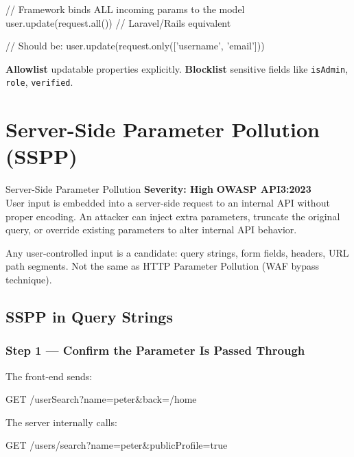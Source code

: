 \documentclass[11pt]{article}
\newcommand{\sev}[1]{\textbf{\textcolor{critical}{Severity: #1}}}
\newcommand{\owasp}[1]{\textbf{\textcolor{httpblue}{#1}}}
\begin{document}
\begin{pseudobox}
// Framework binds ALL incoming params to the model
user.update(request.all())   // Laravel/Rails equivalent

// Should be:
user.update(request.only(['username', 'email']))
\end{pseudobox}

\begin{notebox}[Defense]
\textbf{Allowlist} updatable properties explicitly. \textbf{Blocklist} sensitive fields like \texttt{isAdmin}, \texttt{role}, \texttt{verified}.
\end{notebox}

\section{Server-Side Parameter Pollution (SSPP)}

\begin{vulnbox}{Server-Side Parameter Pollution}
\sev{High} \quad \owasp{OWASP API3:2023}\\[6pt]
User input is embedded into a server-side request to an internal API without proper encoding. An attacker can inject extra parameters, truncate the original query, or override existing parameters to alter internal API behavior.
\end{vulnbox}

\begin{notebox}[Scope]
Any user-controlled input is a candidate: query strings, form fields, headers, URL path segments. Not the same as HTTP Parameter Pollution (WAF bypass technique).
\end{notebox}

\subsection{SSPP in Query Strings}

\subsubsection{Step 1 --- Confirm the Parameter Is Passed Through}

The front-end sends:
\begin{httpbox}
GET /userSearch?name=peter&back=/home
\end{httpbox}
The server internally calls:
\begin{httpbox}
GET /users/search?name=peter&publicProfile=true
\end{httpbox}
\end{document}
